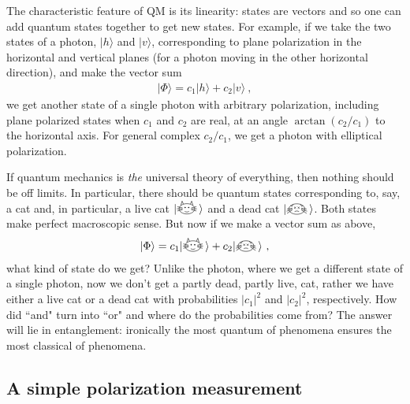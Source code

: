 \documentclass[12pt]{article}
\theoremstyle{plain}
\theoremstyle{definition}
\theoremstyle{remark}
\def\ket#1{| #1\rangle}
\def\LCATH{\raisebox{-2pt}{\begin{tikzpicture}[scale=0.14]
\draw (0,0) ellipse (1.8cm and 1.2cm);
\draw [-] (1,0) -- (2.3,0);
\draw [-] (-1,0) -- (-2.3,0);
\draw [-] (1,-0.2) -- (2.2,-0.5);
\draw [-] (-1,-0.2) -- (-2.2,-0.5);
\draw [-] (1,0.2) -- (2.2,0.5);
\draw [-] (-1,0.2) -- (-2.2,0.5);
\filldraw[black] (0.4,0.3) circle (0.1cm);
\filldraw[black] (-0.4,0.3) circle (0.1cm);
\draw[-] (-0.5,-0.6) to[out=-30,in=210] (0.5,-0.6);
\draw[-] (0.8,1.1) -- (1.1,1.8) -- (1.4,0.8);
\draw[-] (-0.8,1.1) -- (-1.1,1.8) -- (-1.4,0.8);
\end{tikzpicture}
}\!}
\def\DCATH{\raisebox{-2pt}{\begin{tikzpicture}[scale=0.14]
\draw (0,0) ellipse (1.8cm and 1.2cm);
\draw [-] (1,0) -- (2.3,-0.5);
\draw [-] (-1,0) -- (-2.3,-0.5);
\draw [-] (1,-0.2) -- (2.2,-1);
\draw [-] (-1,-0.2) -- (-2.2,-1);
\draw [-] (1,0.2) -- (2.2,0);
\draw [-] (-1,0.2) -- (-2.2,0);
\draw[-] (0.2,0.1) -- (0.6,0.5);
\draw[-] (0.2,0.5) -- (0.6,0.1);
\draw[-] (-0.2,0.1) -- (-0.6,0.5);
\draw[-] (-0.2,0.5) -- (-0.6,0.1);
\draw[-]  (-0.5,-0.6) to[out=30,in=150] (0.5,-0.6);
\draw[-] (0.8,1.1) -- (1.1,0.6) -- (1.4,0.8);
\draw[-] (-0.8,1.1) -- (-1.1,0.6) -- (-1.4,0.8);
\end{tikzpicture}
}\!}
\newcommand{\EQ}[1]{\begin{equation}\begin{split} #1
\end{split}\end{equation}}
\begin{document}
The characteristic feature of QM is its linearity: states are vectors and so one can add quantum states together to get new states. For example, if we take the two states of a photon, $\ket{h}$ and $\ket{v}$, corresponding to plane polarization in the horizontal and vertical planes (for a photon moving in the other horizontal direction), and make the vector sum
\EQ{
\ket{\Phi}=c_1\ket{h}+c_2\ket{v}\ ,
\label{rnn}
}
we get another state of a single photon with arbitrary polarization, including plane polarized states when $c_1$ and $c_2$ are real, at an angle $\arctan(c_2/c_1)$ to the horizontal axis. For general complex $c_2/c_1$, we get a photon with elliptical polarization.

If quantum mechanics is {\it the\/} universal theory of everything, then nothing should be off limits. In particular, there should  be quantum states corresponding to, say, a cat and, in particular, a live cat $\ket{\LCATH}$ and a dead cat $\ket{\DCATH}$. Both states make perfect macroscopic sense. But now if we make a vector sum as above,
\EQ{
\ket{\Phi}=c_1\ket{\LCATH}+c_2\ket{\DCATH}\ ,
\label{scs}
}
what kind of state do we get? Unlike the photon, where we get a different state of a single photon, now we don't get a partly dead, partly live, cat, rather we have either a live cat or a dead cat with probabilities $|c_1|^2$ and $|c_2|^2$, respectively. How did ``and" turn into ``or" and where do the probabilities come from? The answer will lie in entanglement: ironically the most quantum of phenomena ensures the most classical of phenomena.

\subsection{A simple polarization measurement}\label{s2.0}
\end{document}
